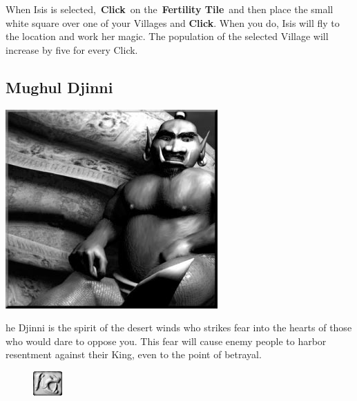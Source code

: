 When Isis is selected, \textbf{Click} on the \textbf{Fertility Tile} and then place the small white square over one of your Villages and \textbf{Click}. When you do, Isis will fly to the location and work her magic. The population of the selected Village will increase by five for every Click.

\subsection{Mughul Djinni}


\begin{center}
	\includegraphics[width=.9\linewidth]{Adjinni}
\end{center}

he Djinni is the spirit of the desert winds who strikes fear into the hearts of those who would dare to oppose you. This fear will cause enemy people to harbor resentment against their King, even to the point of betrayal.

\begin{figure}
	\vspace{-20pt}
	\begin{center}
		\includegraphics[width=0.1\textwidth]{Tdjinni}
	\end{center}
	\vspace{-20pt}
\end{figure}

